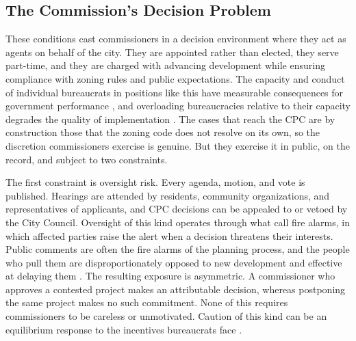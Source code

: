 \subsection{The Commission's Decision Problem} 

These conditions cast commissioners in a decision environment where they act as agents on behalf of the city. They are appointed rather than elected, they serve part-time, and they are charged with advancing development while ensuring compliance with zoning rules and public expectations. The capacity and conduct of individual bureaucrats in positions like this have measurable consequences for government performance \citep{decarolisetal2020, fenizia2022, besthjortszakonyi2023}, and overloading bureaucracies relative to their capacity degrades the quality of implementation \citep{grattonetal2021}. The cases that reach the CPC are by construction those that the zoning code does not resolve on its own, so the discretion commissioners exercise is genuine. But they exercise it in public, on the record, and subject to two constraints.

The first constraint is oversight risk. Every agenda, motion, and vote is published. Hearings are attended by residents, community organizations, and representatives of applicants, and CPC decisions can be appealed to or vetoed by the City Council. Oversight of this kind operates through what \citet{mccubbinsschwartz1984} call fire alarms, in which affected parties raise the alert when a decision threatens their interests. Public comments are often the fire alarms of the planning process, and the people who pull them are disproportionately opposed to new development and effective at delaying them  \citep{einsteinglickpalmer2019, hankinson2018}. The resulting exposure is asymmetric. A commissioner who approves a contested project makes an attributable decision, whereas postponing the same project makes no such commitment. None of this requires commissioners to be careless or unmotivated. Caution of this kind can be an equilibrium response to the incentives bureaucrats face \citep{Prendergast2003}.

